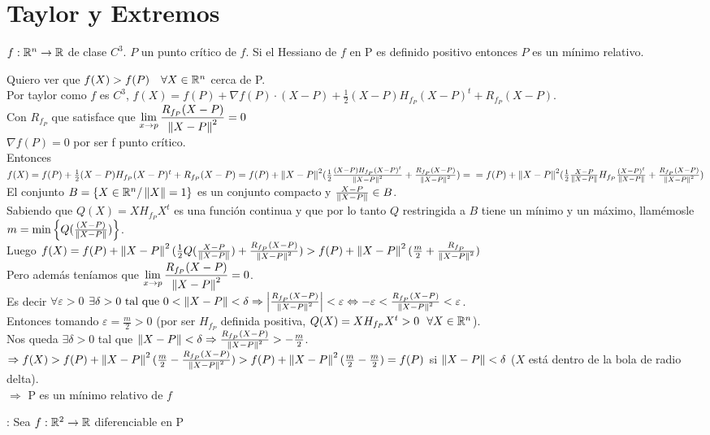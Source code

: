\documentclass[a4paper,10pt]{article}
\begin{document}
\section{Taylor y Extremos}
\propiedad $f : \rene \rightarrow \mathbb{R}$ de clase $C^3$. $P$ un punto crítico de $f$. Si el Hessiano de $f$ en P es definido positivo entonces $P$ es un mínimo relativo.
\begin{demo}
Quiero ver que $f(X) > f(P) \ \ \ \forall X \in \rene$ cerca de P. \\
Por taylor como $f$ es $C^3$, $f(X) = f(P) + \nabla f(P) \cdot (X-P) + \frac{1}{2} (X-P) H_{f_P} (X-P)^t + R_{f_P} (X-P)$. \\
Con $R_{f_P}$ que satisface que $\displaystyle\lim_{x \rightarrow p} \frac{R_{f_P}(X-P)}{\norm{X-P}^2} = 0$ \\
$\nabla f(P) = 0$ por ser f punto crítico. \\
Entonces \\
$f(X) = f(P) + \frac{1}{2} (X-P) H_{f_P} (X-P)^t + R_{f_P} (X-P) = f(P) + {\norm{X-P}}^2 ( \frac{1}{2} \frac{(X-P) H_{f_P} (X-P)^t}{\norm{X-P}^2} + \frac{R_{f_P} (X-P)}{\norm{X-P}^2}) = \\
= f(P) + {\norm{X-P}}^2 ( \frac{1}{2} \frac{X-P}{\norm{X-P}} H_{f_P} \frac{(X-P)^t}{\norm{X-P}} + \frac{R_{f_P} (X-P)}{\norm{X-P}^2}) $ \\
El conjunto $ B =  \left\lbrace X \in \rene / \norm{X} = 1 \right\rbrace $ es un conjunto compacto y $\frac{X-P}{\norm{X-P}} \in B$. \\
Sabiendo que $Q(X) =  X H_{f_P} X^t$ es una función continua y que por lo tanto $Q$ restringida a $B$ tiene un mínimo y un máximo, llamémosle $m = \min \left\lbrace Q(\frac{(X-P)}{\norm{X-P}}) \right\rbrace$. \\
Luego $f(X) = f(P) + \norm{X-P}^2( \frac{1}{2} Q(\frac{X-P}{\norm{X-P}}) + \frac{R_{f_P}(X-P)}{\norm{X-P}^2}) > f(P) + \norm{X-P}^2( \frac{m}{2} + \frac{R_{f_P}}{\norm{X-P}^2}) $ \\
Pero además teníamos que $\displaystyle\lim_{x \rightarrow p} \frac{R_{f_P}(X-P)}{\norm{X-P}^2} = 0$. \\
Es decir $\forall \varepsilon > 0$  $\exists \delta > 0 \mbox{ tal que } 0 < \norm{X-P} < \delta \Rightarrow \abs{\frac{R_{f_P}(X-P)}{\norm{X-P}^2}} < \varepsilon \Leftrightarrow -\varepsilon < \frac{R_{f_P}(X-P)}{\norm{X-P}^2} < \varepsilon$. \\
Entonces tomando $\varepsilon = \frac{m}{2} > 0$ (por ser $H_{f_P}$ definida positiva, $Q(X) = X H_{f_P} X^t  > 0 \ \ \forall X \in \rene$). \\
Nos queda $\exists \delta > 0$ tal que $\norm{X-P} < \delta \Rightarrow \frac{R_{f_P}(X-P)}{\norm{X-P}^2} > - \frac{m}{2}$. \\
$ \Rightarrow f(X) > f(P) + \norm{X-P}^2 ( \frac{m}{2} - \frac{R_{f_P}(X-P)}{\norm{X-P}^2} ) > f(P) + \norm{X-P}^2  (\frac{m}{2} - \frac{m}{2}) = f(P)$ si $\norm{X-P} < \delta$ ($X$ está dentro de la bola de radio delta).\\
$ \Rightarrow$ P es un mínimo relativo de $f$
\end{demo}
: Sea $f: \rene[2] \rightarrow \mathbb{R}$ diferenciable en P
\end{document}

